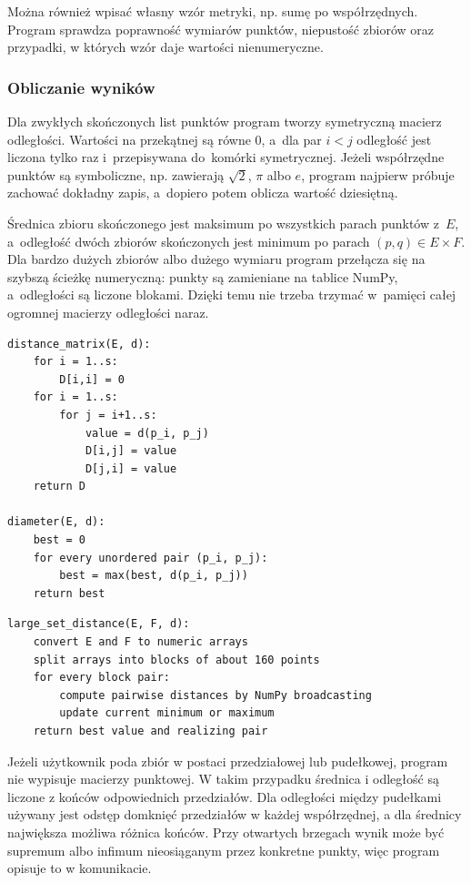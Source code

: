 \documentclass[12pt,a4paper]{article}
\begin{document}
Można również wpisać własny wzór metryki, np. sumę po współrzędnych. Program sprawdza poprawność wymiarów punktów, niepustość zbiorów oraz przypadki, w których wzór daje wartości nienumeryczne.

\subsubsection*{Obliczanie wyników}

Dla zwykłych skończonych list punktów program tworzy symetryczną macierz odległości. Wartości na przekątnej są równe $0$, a~dla par $i<j$ odległość jest liczona tylko raz i~przepisywana do~komórki symetrycznej. Jeżeli współrzędne punktów są symboliczne, np. zawierają $\sqrt{2}$, $\pi$ albo $e$, program najpierw próbuje zachować dokładny zapis, a~dopiero potem oblicza wartość dziesiętną.

Średnica zbioru skończonego jest maksimum po wszystkich parach punktów z~$E$, a~odległość dwóch zbiorów skończonych jest minimum po parach $(p,q)\in E\times F$. Dla bardzo dużych zbiorów albo dużego wymiaru program przełącza się na szybszą ścieżkę numeryczną: punkty są zamieniane na tablice NumPy, a~odległości są liczone blokami. Dzięki temu nie trzeba trzymać w~pamięci całej ogromnej macierzy odległości naraz.

\begin{lstlisting}[style=pseudo,caption={Macierz odległości i średnica zbioru skończonego}]
distance_matrix(E, d):
    for i = 1..s:
        D[i,i] = 0
    for i = 1..s:
        for j = i+1..s:
            value = d(p_i, p_j)
            D[i,j] = value
            D[j,i] = value
    return D

diameter(E, d):
    best = 0
    for every unordered pair (p_i, p_j):
        best = max(best, d(p_i, p_j))
    return best
\end{lstlisting}

\begin{lstlisting}[style=pseudo,caption={Szybka ścieżka dla dużych zbiorów}]
large_set_distance(E, F, d):
    convert E and F to numeric arrays
    split arrays into blocks of about 160 points
    for every block pair:
        compute pairwise distances by NumPy broadcasting
        update current minimum or maximum
    return best value and realizing pair
\end{lstlisting}

Jeżeli użytkownik poda zbiór w postaci przedziałowej lub pudełkowej, program nie wypisuje macierzy punktowej. W takim przypadku średnica i odległość są liczone z końców odpowiednich przedziałów. Dla odległości między pudełkami używany jest odstęp domknięć przedziałów w każdej współrzędnej, a dla średnicy największa możliwa różnica końców. Przy otwartych brzegach wynik może być supremum albo infimum nieosiąganym przez konkretne punkty, więc program opisuje to w komunikacie.
\end{document}
